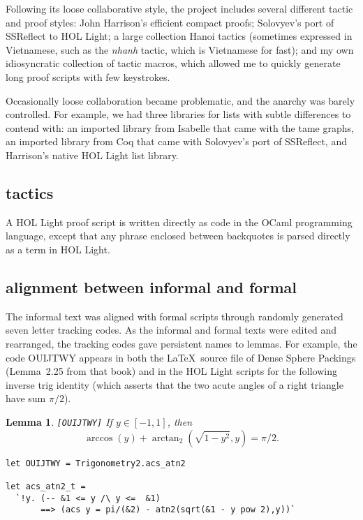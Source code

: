 \documentclass{amsart}
\newtheorem{lemma}[theorem]{Lemma}
\begin{document}
Following its loose collaborative style, the project includes several
different tactic and proof styles: John Harrison's efficient compact
proofs; Solovyev's port of SSReflect to HOL Light; a large collection
Hanoi tactics (sometimes expressed in Vietnamese, such as the
\emph{nhanh} tactic, which is Vietnamese for fast); and my own
idiosyncratic collection of tactic macros, which allowed me to quickly
generate long proof scripts with few keystrokes.

Occasionally loose collaboration became problematic, and the anarchy
was barely controlled.  For example, we had three libraries for lists
with subtle differences to contend with: an imported library from
Isabelle that came with the tame graphs, an imported library from Coq
that came with Solovyev's port of SSReflect, and Harrison's native HOL
Light list library.

\subsection{tactics}

A HOL Light proof script is written directly as code in the
OCaml programming language, except that any phrase enclosed between
backquotes is parsed directly as a term in HOL Light.  




\subsection{alignment between informal and formal}

The informal text was aligned with formal scripts through randomly
generated seven letter tracking codes.  As the informal and formal
texts were edited and rearranged, the tracking codes gave persistent
names to lemmas.  For example, the code OUIJTWY appears in both the
\LaTeX\ source file of Dense Sphere Packings (Lemma~2.25 from that
book) and in the HOL Light scripts for the following inverse trig
identity (which asserts that the two acute angles of a right triangle
have sum $\pi/2$).

\begin{lemma}{\tt [OUIJTWY]} If $y\in [-1,1]$, then
\[
\arccos(y) + \arctan_2\left(\sqrt{1-y^2},y\right) = \pi/2.
\]
\end{lemma}

\begin{verbatim}
let OUIJTWY = Trigonometry2.acs_atn2

let acs_atn2_t = 
  `!y. (-- &1 <= y /\ y <=  &1) 
       ==> (acs y = pi/(&2) - atn2(sqrt(&1 - y pow 2),y))`
\end{verbatim}
\end{document}
